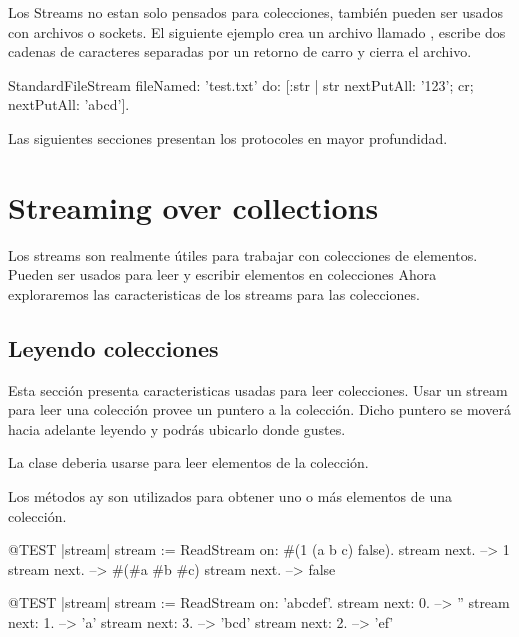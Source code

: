 \documentclass[a4paper,10pt,twoside]{book}
\begin{document}
Los Streams no estan solo pensados para colecciones, tambi\'en pueden ser usados con archivos o sockets.
El siguiente ejemplo crea un archivo llamado , escribe dos cadenas de caracteres separadas por un retorno de carro
y cierra el archivo.

\begin{code}{}
StandardFileStream
  fileNamed: 'test.txt'
  do: [:str | str
                nextPutAll: '123';
                cr;
                nextPutAll: 'abcd'].
\end{code}

Las siguientes secciones presentan los protocoles en mayor profundidad.

\section{Streaming over collections}

Los streams son realmente \'utiles para trabajar con colecciones de elementos. Pueden ser usados para leer y escribir elementos en colecciones
Ahora exploraremos las caracteristicas de los streams para las colecciones.

\subsection{Leyendo colecciones}

Esta secci\'on presenta caracteristicas usadas para leer colecciones. Usar un stream para leer una colecci\'on provee un puntero a la colecci\'on.
Dicho puntero se mover\'a hacia adelante leyendo y podr\'as ubicarlo donde gustes.

La clase  deberia usarse para leer elementos de la colecci\'on.

Los m\'etodos  ay  son utilizados para obtener uno o m\'as elementos de una colecci\'on.


\begin{code}{@TEST |stream|}
stream := ReadStream on: #(1 (a b c) false).
stream next. -->   1
stream next. -->   #(#a #b #c)
stream next. -->   false
\end{code}

\begin{code}{@TEST |stream|}
stream := ReadStream on: 'abcdef'.
stream next: 0. -->   ''
stream next: 1. -->   'a'
stream next: 3. -->   'bcd'
stream next: 2. -->   'ef'
\end{code}
\end{document}
